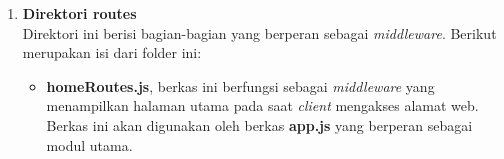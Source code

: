 \begin{enumerate}
\begin{enumerate}
\begin{table}[H]
\begin{tabular}{|p{0.35cm}|p{3cm}|p{7cm}|}
			\end{tabular}
			\label{table:css_stylesheets}
		\end{table}
%			
%			
%			
%			
%			
%			
%			
%			
%			
	\end{enumerate}
	
	\item \textbf{Direktori routes} \\
	Direktori ini berisi bagian-bagian yang berperan sebagai \textit{middleware}. Berikut merupakan isi dari folder ini:
	\begin{itemize}
		\item \textbf{homeRoutes.js}, berkas ini berfungsi sebagai \textit{middleware} yang menampilkan halaman utama pada saat \textit{client} mengakses alamat web. Berkas ini akan digunakan oleh berkas \textbf{app.js} yang berperan sebagai modul utama.
	\end{itemize}


\end{enumerate}
